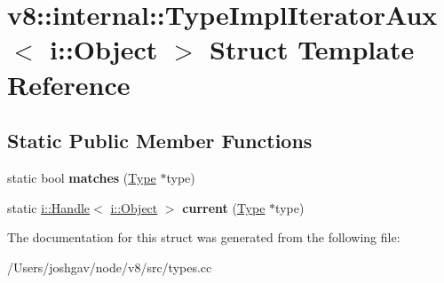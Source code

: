 \hypertarget{structv8_1_1internal_1_1_type_impl_iterator_aux_3_01i_1_1_object_01_4}{}\section{v8\+:\+:internal\+:\+:Type\+Impl\+Iterator\+Aux$<$ i\+:\+:Object $>$ Struct Template Reference}
\label{structv8_1_1internal_1_1_type_impl_iterator_aux_3_01i_1_1_object_01_4}
\subsection*{Static Public Member Functions}
\begin{DoxyCompactItemize}
\item 
static bool {\bfseries matches} (\hyperlink{classv8_1_1internal_1_1_type}{Type} $\ast$type)\hypertarget{structv8_1_1internal_1_1_type_impl_iterator_aux_3_01i_1_1_object_01_4_a03ae0c0b5b7a2efba5ff60d0cef90b37}{}\label{structv8_1_1internal_1_1_type_impl_iterator_aux_3_01i_1_1_object_01_4_a03ae0c0b5b7a2efba5ff60d0cef90b37}

\item 
static \hyperlink{classv8_1_1internal_1_1_handle}{i\+::\+Handle}$<$ \hyperlink{classv8_1_1internal_1_1_object}{i\+::\+Object} $>$ {\bfseries current} (\hyperlink{classv8_1_1internal_1_1_type}{Type} $\ast$type)\hypertarget{structv8_1_1internal_1_1_type_impl_iterator_aux_3_01i_1_1_object_01_4_afe8ac365803bb450a190e7c1122d4d85}{}\label{structv8_1_1internal_1_1_type_impl_iterator_aux_3_01i_1_1_object_01_4_afe8ac365803bb450a190e7c1122d4d85}

\end{DoxyCompactItemize}


The documentation for this struct was generated from the following file\+:\begin{DoxyCompactItemize}
\item 
/\+Users/joshgav/node/v8/src/types.\+cc\end{DoxyCompactItemize}
